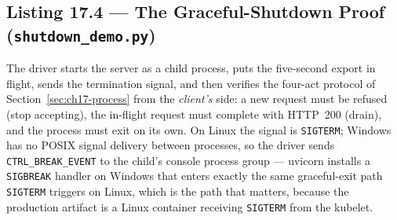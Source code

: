 \subsection{Listing 17.4 --- The Graceful-Shutdown Proof (\texttt{shutdown\_demo.py})}
\label{sec:ch17-shutdown}
\label{lst:ch17-shutdown}

The driver starts the server as a child process, puts the five-second
export in flight, sends the termination signal, and then verifies the
four-act protocol of Section~\ref{sec:ch17-process} from the
\emph{client's} side: a new request must be refused (stop accepting), the
in-flight request must complete with HTTP~200 (drain), and the process
must exit on its own. On Linux the signal is \texttt{SIGTERM}; Windows
has no POSIX signal delivery between processes, so the driver sends
\texttt{CTRL\_BREAK\_EVENT} to the child's console process group ---
uvicorn installs a \texttt{SIGBREAK} handler on Windows that enters
exactly the same graceful-exit path \texttt{SIGTERM} triggers on Linux,
which is the path that matters, because the production artifact is a
Linux container receiving \texttt{SIGTERM} from the kubelet.

